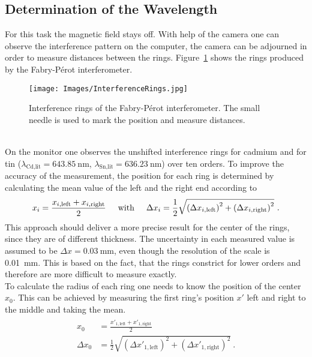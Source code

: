 \subsection{Determination of the Wavelength}
\label{toc:Wavelength}
For this task the magnetic field stays off. 
With help of the camera one can observe the interference pattern on the computer, the camera can be adjourned in order to measure distances between the rings. 
Figure~\ref{fig:InterferenceRings} shows the rings produced by the Fabry-P\'erot interferometer.
\begin{figure}[ht]	 
	\centering
	\texttt{[image: Images/InterferenceRings.jpg]}
	\caption[Interference Rings of the Fabry-P\'erot Interferometer]{Interference rings of the Fabry-P\'erot interferometer. The small needle is used to mark the position and measure distances.}
	\label{fig:InterferenceRings}
\end{figure}\\
On the monitor one observes the unshifted interference rings for cadmium and for tin ($\lambda_\text{Cd,lit} = \SI{643.85}{\nano\metre}$, $\lambda_\text{Sn,lit} = \SI{636.23}{\nm}$) over ten orders. 
To improve the accuracy of the measurement, the position for each ring is determined by calculating the mean value of the left and the right end according to
\begin{align}
	x_i = \frac{x_{i,\text{left}} + x_{i,\text{right}}}{2} \hspace{0.5cm} \text{with} \hspace{0.5cm} \Delta x_i = \frac{1}{2}\sqrt{\left(\Delta x_{i,\text{left}}\right)^2 + \left(\Delta x_{i,\text{right}}\right)^2}\ .
\end{align}
This approach should deliver a more precise result for the center of the rings, since they are of different thickness. 
The uncertainty in each measured value is assumed to be $\Delta x = \SI{0.03}{\mm}$, even though the resolution of the scale is \SI{0.01}{\mm}. This is based on the fact, that the rings constrict for lower orders and therefore are more difficult to measure exactly.\\
To calculate the radius of each ring one needs to know the position of the center $x_0$. 
This can be achieved by measuring the first ring's position $x'$ left and right to the middle and taking the mean.
\begin{align}
	\begin{split}
		x_0 &= \frac{x'_{1,\text{left}} + x'_{1,\text{right}}}{2}\\
		\Delta x_0 &= \frac{1}{2}\sqrt{(\Delta x'_{1,\text{left}})^2 + (\Delta x'_{1,\text{right}})^2}\ .
	\end{split}
\end{align}  
